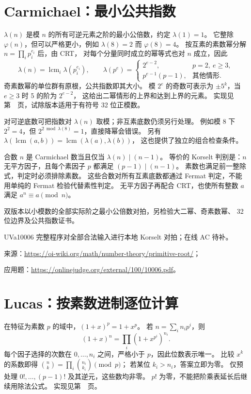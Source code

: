 \section{Carmichael：最小公共指数}\label{knowledge-carmichael}
$\lambda(n)$ 是模 $n$ 的所有可逆元素之阶的最小公倍数，约定 $\lambda(1)=1$。
它整除 $\varphi(n)$，但可以严格更小，例如 $\lambda(8)=2$ 而 $\varphi(8)=4$。
按互素的素数幂分解 $n=\prod_i p_i^{e_i}$ 后，由 CRT，
对每个分量同时成立的幂等式也对 $n$ 成立，因此
\[
\lambda(n)=\operatorname{lcm}_i\lambda(p_i^{e_i}),\qquad
\lambda(p^e)=
\begin{cases}
2^{e-2},&p=2,\ e\ge3,\\
p^{e-1}(p-1),&\text{其他情形}.
\end{cases}
\]
奇素数幂的单位群有原根，公共指数即其大小。
模 $2^e$ 的奇数可表示为 $\pm5^k$，当 $e\ge3$ 时 5 的阶为 $2^{e-2}$，
这给出二幂情形的上界和达到上界的元素。
实现见第~\pageref{compact-carmichael}~页，试除版本适用于有符号 32 位正模数。

对可逆底数可把指数对 $\lambda(n)$ 取模；非互素底数仍须另行处理。
例如模 8 下 $2^2=4$，但 $2^{2\bmod\lambda(8)}=1$，直接降幂会错误。
另有 $\lambda(\operatorname{lcm}(a,b))=\operatorname{lcm}(\lambda(a),\lambda(b))$，
这也提供了独立的组合检查条件。

合数 $n$ 是 Carmichael 数当且仅当 $\lambda(n)\mid(n-1)$。
等价的 Korselt 判别是：$n$ 无平方因子，且每个素因子 $p$ 都满足 $(p-1)\mid(n-1)$。
素数也满足前一整除式，判定时必须排除素数。
这些合数对所有互素底数都通过 Fermat 判定，不能用单纯的 Fermat 检验代替素性判定。
无平方因子再配合 CRT，也使所有整数 $a$ 满足 $a^n\equiv a\pmod n$。

双版本以小模数的全部实际阶之最小公倍数对拍，另检验大二幂、奇素数幂、
32 位边界及公共指数证书。

UVa10006 完整程序对全部合法输入进行本地 Korselt 对拍；在线 AC 待补。

来源：\url{https://oi-wiki.org/math/number-theory/primitive-root/}；

应用题：\url{https://onlinejudge.org/external/100/10006.pdf}。

\section{Lucas：按素数进制逐位计算}\label{knowledge-lucas}
在特征为素数 $p$ 的域中，$(1+x)^p=1+x^p$。
若 $n=\sum_i n_ip^i$，则
\[
(1+x)^n=\prod_i(1+x^{p^i})^{n_i}.
\]
每个因子选择的次数在 $0,\ldots,n_i$ 之间，严格小于 $p$，因此位数表示唯一。
比较 $x^k$ 的系数即得 $\binom nk=\prod_i\binom{n_i}{k_i}\pmod p$；
若某位 $k_i>n_i$，答案立即为零。
仅预处理 $0!,\ldots,(p-1)!$ 及其逆元，这些数均非零。
$p!$ 为零，不能把阶乘表延长后继续用除法公式。
实现见第~\pageref{compact-Lucas}~页。


